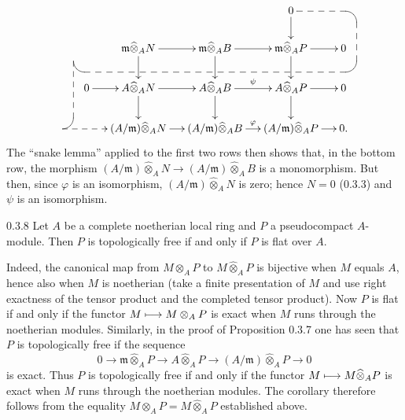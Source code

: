 \[
\xymatrix@C=13pt@R=20pt{
&&&0\ar[d]\ar@{-->} `r[dr]+<12pt,15pt> `d[ddr]+<12pt,15pt> `l[ddlll]+<-12pt,15pt> `d[dddlll]+<-12pt,0pt> [dddll]\\
&\mathfrak m\widehat\otimes_A N\ar[r]\ar[d]&\mathfrak m\widehat\otimes_A B\ar[r]\ar[d]&\mathfrak m\widehat\otimes_A P\ar[r]\ar[d]&0\\
0\ar[r]&A\widehat\otimes_A N\ar[r]\ar[d]&A\widehat\otimes_A B\ar[r]^\psi\ar[d]&A\widehat\otimes_A P\ar[r]\ar[d]&0\\
&(A/\mathfrak m)\widehat\otimes_A N\ar[r]&(A/\mathfrak m)\widehat\otimes_A B\ar[r]^\varphi&(A/\mathfrak m)\widehat\otimes_A P\ar[r]&0.}
\]
The ``snake lemma'' applied to the first two rows then shows that, in the bottom row, the morphism $(A/\mathfrak m)\widehat\otimes_A N\to(A/\mathfrak m)\widehat\otimes_A B$ is a monomorphism. But then, since $\varphi$ is an isomorphism, $(A/\mathfrak m)\widehat\otimes_A N$ is zero; hence $N=0$ (0.3.3) and $\psi$ is an isomorphism.

\begin{corollary}{0.3.8}\label{VIIB.0.3.8}
Let $A$ be a complete noetherian local ring and $P$ a pseudocompact $A$-module. Then $P$ is topologically free if and only if $P$ is flat over $A$.
\end{corollary}
Indeed, the canonical map from $M\otimes_A P$ to $M\widehat\otimes_A P$ is bijective when $M$ equals $A$, hence also when $M$ is noetherian (take a finite presentation of $M$ and use right exactness of the tensor product and the completed tensor product).
Now $P$ is flat if and only if the functor $M\longmapsto M\otimes_A P$ is exact when $M$ runs through the noetherian modules. Similarly, in the proof of Proposition 0.3.7 one has seen that $P$ is topologically free if the sequence
\[
0\to\mathfrak m\widehat\otimes_A P\to A\widehat\otimes_A P\to(A/\mathfrak m)\widehat\otimes_A P\to0
\]
is exact. Thus $P$ is topologically free if and only if the functor $M\longmapsto M\widehat\otimes_A P$ is exact when $M$ runs through the noetherian modules. The corollary therefore follows from the equality $M\otimes_A P=M\widehat\otimes_A P$ established above.

